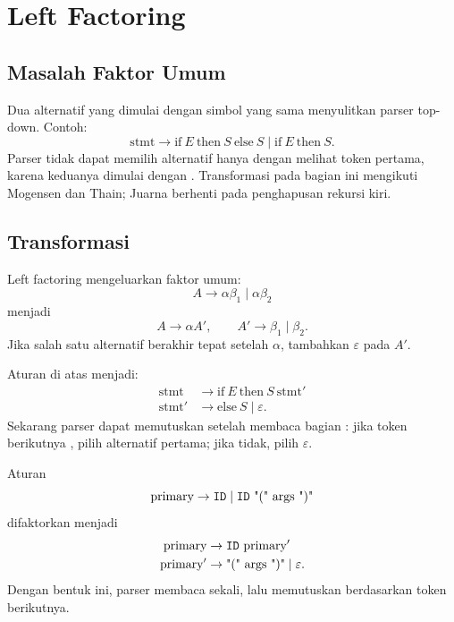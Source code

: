 \section{Left Factoring}
\label{sec:ch09-left-factoring}

\subsection{Masalah Faktor Umum}

Dua alternatif yang dimulai dengan simbol yang sama menyulitkan
parser top-down. Contoh:
\[
\text{stmt} \to \text{if}\ E\ \text{then}\ S\
\text{else}\ S \mid \text{if}\ E\ \text{then}\ S.
\]
Parser tidak dapat memilih alternatif hanya dengan melihat token
pertama, karena keduanya dimulai dengan \code{if}. Transformasi pada
bagian ini mengikuti Mogensen dan Thain; Juarna berhenti pada
penghapusan rekursi kiri.

\subsection{Transformasi}

Left factoring mengeluarkan faktor umum:
\[
A \to \alpha\beta_1 \mid \alpha\beta_2
\]
menjadi
\[
A \to \alpha A', \qquad A' \to \beta_1 \mid \beta_2.
\]
Jika salah satu alternatif berakhir tepat setelah \(\alpha\), tambahkan
\(\varepsilon\) pada \(A'\).

\begin{contoh}[If-else]
Aturan di atas menjadi:
\[
\begin{aligned}
\text{stmt} &\to \text{if}\ E\ \text{then}\ S\ \text{stmt}'\\
\text{stmt}' &\to \text{else}\ S \mid \varepsilon.
\end{aligned}
\]
Sekarang parser dapat memutuskan setelah membaca bagian
: jika token berikutnya , pilih alternatif
pertama; jika tidak, pilih \(\varepsilon\).
\end{contoh}

\begin{contoh}
Aturan
\[
\text{primary} \to \texttt{ID} \mid \texttt{ID}\ \text{"("}\
\text{args}\ \text{")"}
\]
difaktorkan menjadi
\[
\begin{aligned}
\text{primary} &\to \texttt{ID}\ \text{primary}'\\
\text{primary}' &\to \text{"("}\ \text{args}\ \text{")"}
\mid \varepsilon.
\end{aligned}
\]
Dengan bentuk ini, parser membaca  sekali, lalu memutuskan
berdasarkan token berikutnya.
\end{contoh}

